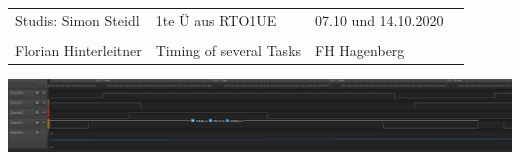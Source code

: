 \documentclass{article}
\begin{document}
\pagestyle{empty}

	\begin{tabular}{|l|l|ll|}
	\hline
	Studis:	Simon Steidl	& 1te Ü aus RTO1UE				& 07.10 und 14.10.2020		& \\
	\hspace{0.2\textwidth}	& \hspace{0.5\textwidth}	& \hspace{0.2\textwidth}	& \\
	Florian Hinterleitner	& Timing of several Tasks 	& FH Hagenberg	& \\
	\hline
	\end  {tabular}



\includegraphics[width=.8\textwidth]{Saleae_nonense}
% 
\end{document}
